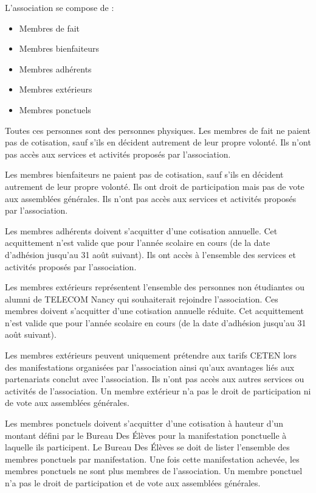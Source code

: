 \documentclass{article} %
\begin{document}
			L’association se compose de :
			\begin{itemize}
				\item Membres de fait
				\item Membres bienfaiteurs
				\item Membres adhérents
				\item Membres extérieurs
				\item Membres ponctuels
			\end{itemize}

			Toutes ces personnes sont des personnes physiques. Les membres de
			fait ne paient pas de cotisation, sauf s’ils en décident autrement
			de leur propre volonté. Ils n’ont pas accès aux services et
			activités proposés par l’association.

			Les membres bienfaiteurs ne paient pas de cotisation, sauf s’ils en
			décident autrement de leur propre volonté. Ils ont droit de
			participation mais pas de vote aux assemblées générales. Ils n’ont
			pas accès aux services et activités proposés par l’association.

			Les membres adhérents doivent s’acquitter d’une cotisation annuelle.
			Cet acquittement n’est valide que pour l’année scolaire en cours
			(de la date d’adhésion jusqu’au 31 août suivant). Ils ont accès à
			l’ensemble des services et activités proposés par l’association.

			Les membres extérieurs représentent l’ensemble des personnes non
			étudiantes ou alumni de TELECOM Nancy qui souhaiterait rejoindre
			l’association. Ces membres doivent s’acquitter d’une cotisation
			annuelle réduite. Cet acquittement n’est valide que pour l’année
			scolaire en cours (de la date d’adhésion jusqu’au 31 août suivant).

			Les membres extérieurs peuvent uniquement prétendre aux tarifs CETEN
			lors des manifestations organisées par l’association ainsi qu’aux
			avantages liés aux partenariats conclut avec l’association. Ils
			n’ont pas accès aux autres services ou activités de l’association.
			Un membre extérieur n’a pas le droit de participation ni de vote aux
			assemblées générales.

			Les membres ponctuels doivent s’acquitter d’une cotisation à hauteur
			d’un montant défini par le Bureau Des Élèves pour la manifestation
			ponctuelle à laquelle ils participent. Le Bureau Des Élèves se doit
			de lister l’ensemble des membres ponctuels par manifestation. Une
			fois cette manifestation achevée, les membres ponctuels ne sont plus
			membres de l’association. Un membre ponctuel n’a pas le droit de
			participation et de vote aux assemblées générales.
\end{document}
